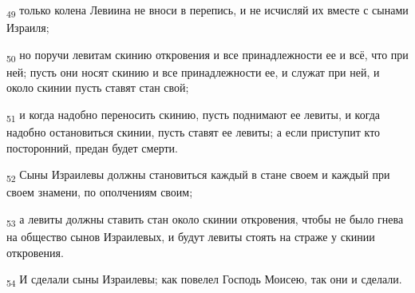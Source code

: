 \begin{tcolorbox}
\textsubscript{49} только колена Левиина не вноси в перепись, и не исчисляй их вместе с сынами Израиля;
\end{tcolorbox}
\begin{tcolorbox}
\textsubscript{50} но поручи левитам скинию откровения и все принадлежности ее и всё, что при ней; пусть они носят скинию и все принадлежности ее, и служат при ней, и около скинии пусть ставят стан свой;
\end{tcolorbox}
\begin{tcolorbox}
\textsubscript{51} и когда надобно переносить скинию, пусть поднимают ее левиты, и когда надобно остановиться скинии, пусть ставят ее левиты; а если приступит кто посторонний, предан будет смерти.
\end{tcolorbox}
\begin{tcolorbox}
\textsubscript{52} Сыны Израилевы должны становиться каждый в стане своем и каждый при своем знамени, по ополчениям своим;
\end{tcolorbox}
\begin{tcolorbox}
\textsubscript{53} а левиты должны ставить стан около скинии откровения, чтобы не было гнева на общество сынов Израилевых, и будут левиты стоять на страже у скинии откровения.
\end{tcolorbox}
\begin{tcolorbox}
\textsubscript{54} И сделали сыны Израилевы; как повелел Господь Моисею, так они и сделали.
\end{tcolorbox}
